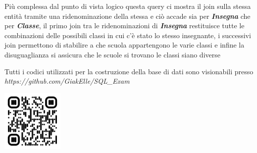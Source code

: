 \documentclass{article}
\begin{document}
\vspace{0.5 cm}

Più complessa dal punto di vista logico questa query ci mostra il join sulla stessa entità tramite una ridenominazione della stessa e ciò accade sia per \textit{\textbf{Insegna}} che per \textit{\textbf{Classe}}, il primo join tra le ridenominazioni di \textit{\textbf{Insegna}} restituisce tutte le combinazioni delle possibili classi in cui c’è stato lo stesso insegnante, i successivi join permettono di stabilire a che scuola appartengono le varie classi e infine la disuguaglianza si assicura che le scuole si trovano le classi siano diverse

\vspace{8.0
cm}
Tutti i codici utilizzati per la costruzione della base di dati sono visionabili presso \textit{https://github.com/GiakElle/SQL\_Exam}

\centering
\includegraphics[width=3cm, height=3cm]{qr-code.png}
\textit{\textbf{}}
\end{document}
